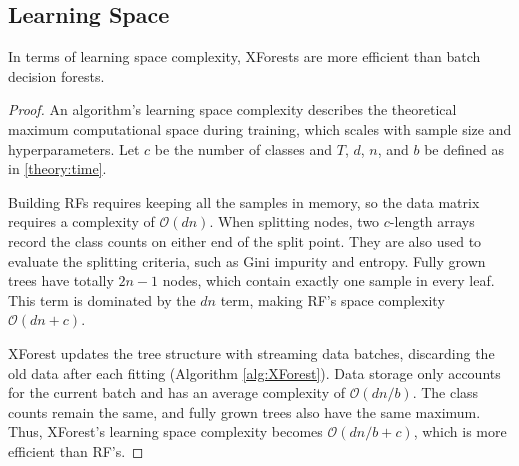 \subsection{Learning Space}
\begin{lemma}
In terms of learning space complexity, XForests are more efficient than batch decision forests.
\end{lemma} \vspace{-0.3cm}
\begin{proof}
An algorithm's learning space complexity describes the theoretical maximum computational space during training, which scales with sample size and hyperparameters. Let $c$ be the number of classes and $T$, $d$, $n$, and $b$ be defined as in \ref{theory:time}. 

Building RFs requires keeping all the samples in memory, so the data matrix requires a complexity of $\mathcal{O}(dn)$. When splitting nodes, two $c$-length arrays record the class counts on either end of the split point. They are also used to evaluate the splitting criteria, such as Gini impurity and entropy. Fully grown trees have totally $2n - 1$ nodes, which contain exactly one sample in every leaf. This term is dominated by the $dn$ term, making RF's space complexity $\mathcal{O}(dn + c)$.

XForest updates the tree structure with streaming data batches, discarding the old data after each fitting (Algorithm \ref{alg:XForest}). Data storage only accounts for the current batch and has an average complexity of $\mathcal{O}(dn/b)$. The class counts remain the same, and fully grown trees also have the same maximum. Thus, XForest's learning space complexity becomes $\mathcal{O}(dn/b + c)$, which is more efficient than RF's.
\end{proof}



